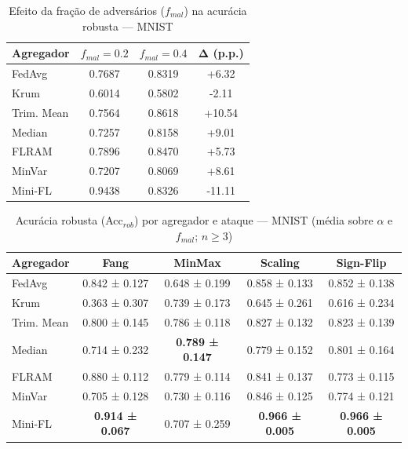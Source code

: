\begin{table}[H]
\centering
\caption{Efeito da fração de adversários ($f_{mal}$) na acurácia robusta — MNIST}
\label{tab:efeito_fmal}
\footnotesize
\setlength{\tabcolsep}{3pt}
\begin{tabular}{@{}lccc@{}}
\toprule
\textbf{Agregador} & \textbf{$f_{mal}=0.2$} & \textbf{$f_{mal}=0.4$} & \textbf{Δ (p.p.)} \\
\midrule
FedAvg & 0.7687 & 0.8319 & +6.32 \\
Krum & 0.6014 & 0.5802 & -2.11 \\
Trim. Mean & 0.7564 & 0.8618 & +10.54 \\
Median & 0.7257 & 0.8158 & +9.01 \\
FLRAM & 0.7896 & 0.8470 & +5.73 \\
MinVar & 0.7207 & 0.8069 & +8.61 \\
Mini-FL & 0.9438 & 0.8326 & -11.11 \\
\bottomrule
\end{tabular}
\end{table}
\begin{table}[H]
\centering
\caption{Acurácia robusta (Acc$_{rob}$) por agregador e ataque — MNIST (média sobre $\alpha$ e $f_{mal}$; $n \geq 3$)}
\label{tab:robust_acc_mnist}
\footnotesize
\setlength{\tabcolsep}{3pt}
\begin{tabular}{@{}lcccc@{}}
\toprule
\textbf{Agregador} & \textbf{Fang} & \textbf{MinMax} & \textbf{Scaling} & \textbf{Sign-Flip} \\
\midrule
FedAvg & 0.842 ± 0.127 & 0.648 ± 0.199 & 0.858 ± 0.133 & 0.852 ± 0.138 \\
Krum & 0.363 ± 0.307 & 0.739 ± 0.173 & 0.645 ± 0.261 & 0.616 ± 0.234 \\
Trim. Mean & 0.800 ± 0.145 & 0.786 ± 0.118 & 0.827 ± 0.132 & 0.823 ± 0.139 \\
Median & 0.714 ± 0.232 & \textbf{0.789 ± 0.147} & 0.779 ± 0.152 & 0.801 ± 0.164 \\
FLRAM & 0.880 ± 0.112 & 0.779 ± 0.114 & 0.841 ± 0.137 & 0.773 ± 0.115 \\
MinVar & 0.705 ± 0.128 & 0.730 ± 0.116 & 0.846 ± 0.125 & 0.774 ± 0.121 \\
Mini-FL & \textbf{0.914 ± 0.067} & 0.707 ± 0.259 & \textbf{0.966 ± 0.005} & \textbf{0.966 ± 0.005} \\
\bottomrule
\end{tabular}
\end{table}
